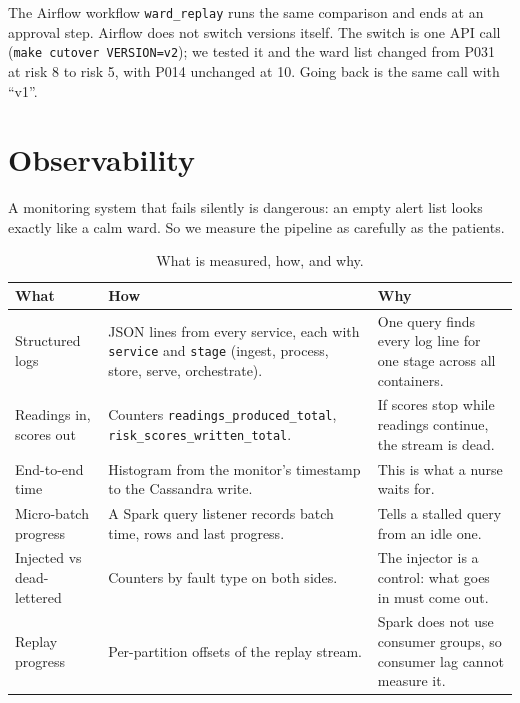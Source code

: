\documentclass[11pt,a4paper]{article}
\begin{document}
The Airflow workflow \texttt{ward\_replay} runs the same comparison and ends at an
approval step. Airflow does not switch versions itself. The switch is one API call
(\texttt{make cutover VERSION=v2}); we tested it and the ward list changed from P031 at
risk 8 to risk 5, with P014 unchanged at 10. Going back is the same call with ``v1''.

\section{Observability}

A monitoring system that fails silently is dangerous: an empty alert list looks exactly
like a calm ward. So we measure the pipeline as carefully as the patients.

\begin{table}[H]\centering\small
\begin{tabularx}{\linewidth}{|p{3.2cm}|X|X|}
\hline
\rowcolor{tablehead}\textbf{What} & \textbf{How} & \textbf{Why} \\ \hline
Structured logs & JSON lines from every service, each with \texttt{service} and
\texttt{stage} (ingest, process, store, serve, orchestrate). & One query finds every
log line for one stage across all containers. \\ \hline
Readings in, scores out & Counters \texttt{readings\_produced\_total},
\texttt{risk\_scores\_written\_total}. & If scores stop while readings continue, the
stream is dead. \\ \hline
End-to-end time & Histogram from the monitor's timestamp to the Cassandra write. &
This is what a nurse waits for. \\ \hline
Micro-batch progress & A Spark query listener records batch time, rows and last
progress. & Tells a stalled query from an idle one. \\ \hline
Injected vs dead-lettered & Counters by fault type on both sides. & The injector is a
control: what goes in must come out. \\ \hline
Replay progress & Per-partition offsets of the replay stream. & Spark does not use
consumer groups, so consumer lag cannot measure it. \\ \hline
\end{tabularx}
\caption{What is measured, how, and why.}\label{tab:obs}
\end{table}
\end{document}
